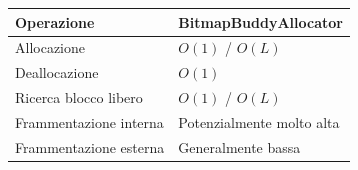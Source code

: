 \begin{center}
\begin{tabular}{|l|l|}
\hline
Operazione & BitmapBuddyAllocator \\
\hline
Allocazione & $O(1)$ / $O(L)$ \\
Deallocazione & $O(1)$ \\
Ricerca blocco libero & $O(1)$ / $O(L)$ \\
Frammentazione interna & Potenzialmente molto alta \\
Frammentazione esterna & Generalmente bassa \\
\hline
\end{tabular}
\end{center}
